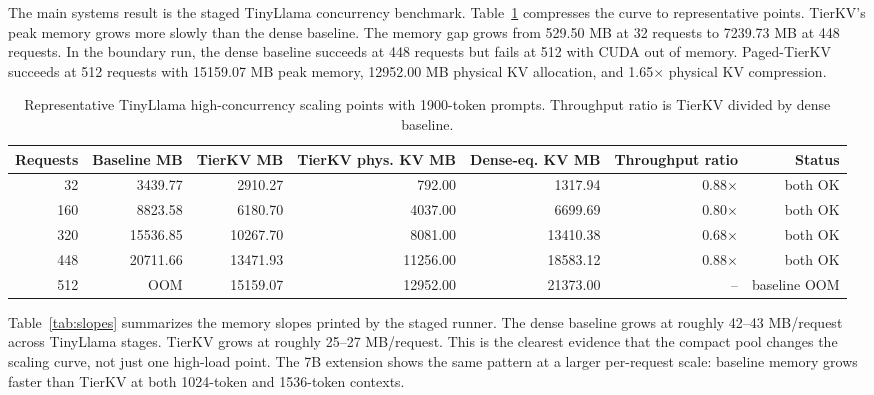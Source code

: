 \documentclass{article}
\begin{document}
The main systems result is the staged TinyLlama concurrency benchmark. Table~\ref{tab:scaling} compresses the curve to representative points. TierKV's peak memory grows more slowly than the dense baseline. The memory gap grows from 529.50 MB at 32 requests to 7239.73 MB at 448 requests. In the boundary run, the dense baseline succeeds at 448 requests but fails at 512 with CUDA out of memory. Paged-TierKV succeeds at 512 requests with 15159.07 MB peak memory, 12952.00 MB physical KV allocation, and 1.65$\times$ physical KV compression.

\begin{table}[hbtp]
\caption{Representative TinyLlama high-concurrency scaling points with 1900-token prompts. Throughput ratio is TierKV divided by dense baseline.}
\label{tab:scaling}
\vskip 0.15in
\begin{center}
\begin{small}
\begin{tabular}{rrrrrrr}
\toprule
Requests & Baseline MB & TierKV MB & TierKV phys. KV MB & Dense-eq. KV MB & Throughput ratio & Status \\
\midrule
32 & 3439.77 & 2910.27 & 792.00 & 1317.94 & 0.88$\times$ & both OK \\
160 & 8823.58 & 6180.70 & 4037.00 & 6699.69 & 0.80$\times$ & both OK \\
320 & 15536.85 & 10267.70 & 8081.00 & 13410.38 & 0.68$\times$ & both OK \\
448 & 20711.66 & 13471.93 & 11256.00 & 18583.12 & 0.88$\times$ & both OK \\
512 & OOM & 15159.07 & 12952.00 & 21373.00 & -- & baseline OOM \\
\bottomrule
\end{tabular}
\end{small}
\end{center}
\vskip -0.1in
\end{table}

Table~\ref{tab:slopes} summarizes the memory slopes printed by the staged runner. The dense baseline grows at roughly 42--43 MB/request across TinyLlama stages. TierKV grows at roughly 25--27 MB/request. This is the clearest evidence that the compact pool changes the scaling curve, not just one high-load point. The 7B extension shows the same pattern at a larger per-request scale: baseline memory grows faster than TierKV at both 1024-token and 1536-token contexts.
\end{document}
